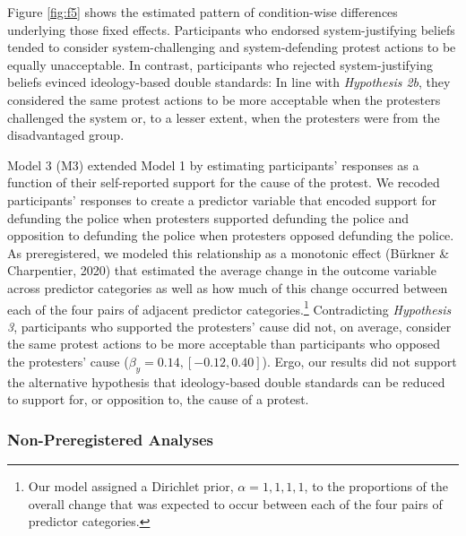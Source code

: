 \documentclass[twocolumn, 11pt, letterpaper]{article}
\begin{document}
Figure \ref{fig:f5} shows the estimated pattern of condition-wise
differences underlying those fixed effects. Participants who endorsed
system-justifying beliefs tended to consider system-challenging and
system-defending protest actions to be equally unacceptable. In
contrast, participants who rejected system-justifying beliefs evinced
ideology-based double standards: In line with \emph{Hypothesis 2b}, they
considered the same protest actions to be more acceptable when the
protesters challenged the system or, to a lesser extent, when the
protesters were from the disadvantaged group.

Model 3 (M3) extended Model 1 by estimating participants' responses as a
function of their self-reported support for the cause of the protest. We
recoded participants' responses to create a predictor variable that
encoded support for defunding the police when protesters supported
defunding the police and opposition to defunding the police when
protesters opposed defunding the police. As preregistered, we modeled
this relationship as a monotonic effect (Bürkner \& Charpentier, 2020)
that estimated the average change in the outcome variable across
predictor categories as well as how much of this change occurred between
each of the four pairs of adjacent predictor categories.\footnote{Our
  model assigned a Dirichlet prior, \(\alpha = {1, 1, 1, 1}\), to the
  proportions of the overall change that was expected to occur between
  each of the four pairs of predictor categories.} Contradicting
\emph{Hypothesis 3}, participants who supported the protesters' cause
did not, on average, consider the same protest actions to be more
acceptable than participants who opposed the protesters' cause
(\(\beta_{y} = 0.14, [-0.12, 0.40]\)). Ergo, our results did not support
the alternative hypothesis that ideology-based double standards can be
reduced to support for, or opposition to, the cause of a protest.

\hypertarget{non-preregistered-analyses-1}{%
\subsubsection{Non-Preregistered
Analyses}\label{non-preregistered-analyses-1}}
\end{document}
